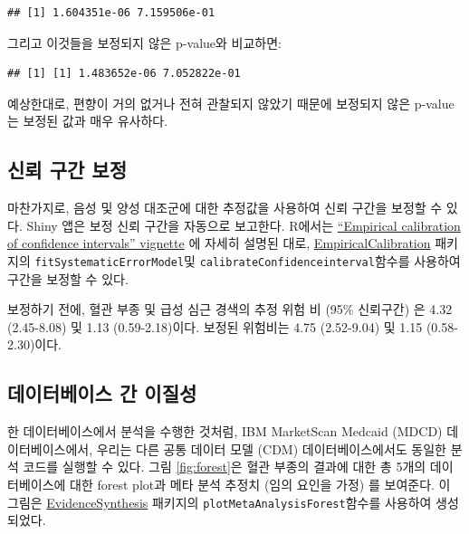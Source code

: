 \documentclass[11pt]{book}
\newenvironment{Shaded}{\begin{snugshade}}{\end{snugshade}}
\newcommand{\OperatorTok}[1]{\textcolor[rgb]{0.81,0.36,0.00}{\textbf{#1}}}
\newcommand{\NormalTok}[1]{#1}
\theoremstyle{definition}
\theoremstyle{definition}
\theoremstyle{definition}
\theoremstyle{remark}
\begin{document}
\begin{verbatim}
## [1] 1.604351e-06 7.159506e-01
\end{verbatim}

그리고 이것들을 보정되지 않은 p-value와 비교하면:

\begin{Shaded}
\end{Shaded}

\begin{verbatim}
## [1] [1] 1.483652e-06 7.052822e-01
\end{verbatim}

예상한대로, 편향이 거의 없거나 전혀 관찰되지 않았기 때문에 보정되지 않은
p-value는 보정된 값과 매우 유사하다.

\subsection{신뢰 구간 보정}\label{---1}

마찬가지로, 음성 및 양성 대조군에 대한 추정값을 사용하여 신뢰 구간을
보정할 수 있다. Shiny 앱은 보정 신뢰 구간을 자동으로 보고한다. R에서는
\href{https://ohdsi.github.io/EmpiricalCalibration/articles/EmpiricalCiCalibrationVignette.html}{``Empirical
calibration of confidence intervals'' vignette} 에 자세히 설명된 대로,
\href{https://ohdsi.github.io/EmpiricalCalibration/}{EmpiricalCalibration}
패키지의 \texttt{fitSystematicErrorModel}및
\texttt{calibrateConfidenceinterval}함수를 사용하여 구간을 보정할 수
있다.

보정하기 전에, 혈관 부종 및 급성 심근 경색의 추정 위험 비 (95\%
신뢰구간) 은 4.32 (2.45-8.08) 및 1.13 (0.59-2.18)이다. 보정된 위험비는
4.75 (2.52-9.04) 및 1.15 (0.58-2.30)이다.

\subsection{데이터베이스 간 이질성}\label{--}

한 데이터베이스에서 분석을 수행한 것처럼, IBM MarketScan Medcaid (MDCD)
데이터베이스에서, 우리는 다른 공통 데이터 모델 (CDM) 데이터베이스에서도
동일한 분석 코드를 실행할 수 있다. 그림 \ref{fig:forest}은 혈관 부종의
결과에 대한 총 5개의 데이터베이스에 대한 forest plot과 메타 분석 추정치
(임의 요인을 가정) \citep{dersimonian_1986} 를 보여준다. 이 그림은
\href{https://ohdsi.github.io/EvidenceSynthesis/}{EvidenceSynthesis}
패키지의 \texttt{plotMetaAnalysisForest}함수를 사용하여 생성되었다.
\end{document}
